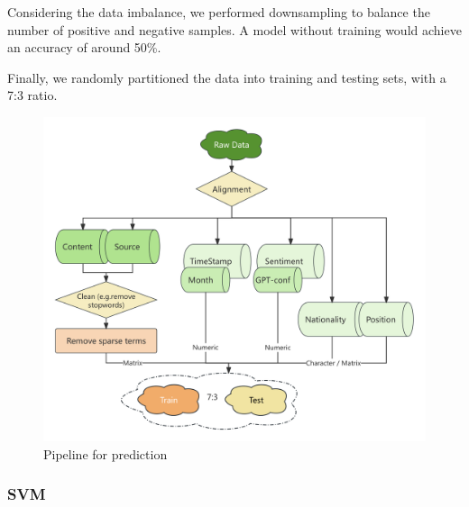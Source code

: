 



Considering the data imbalance, we performed downsampling to balance the number of positive and negative samples. A model without training would achieve an accuracy of around 50\%.

Finally, we randomly partitioned the data into training and testing sets, with a 7:3 ratio.




\begin{figure}[ht]
    \centering
    \includegraphics[width=.7\textwidth]{figs/pred_pipe.png}
    \caption{
        Pipeline for prediction
    }\label{fig:pred_pipe}
\end{figure}


\subsubsection{SVM}


